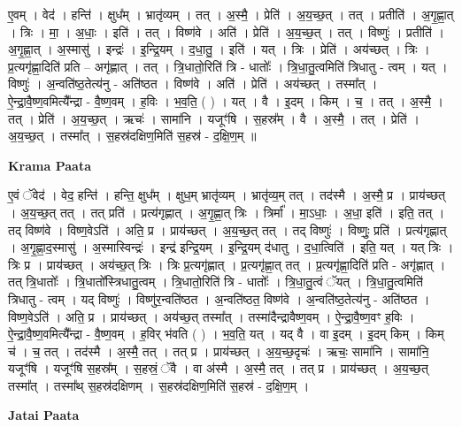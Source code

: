 \documentclass[17pt]{extarticle}
\begin{document}
ए॒वम् । वेद॑ । हन्ति॑ । क्षुध᳚म् । भ्रातृ॑व्यम् । तत् । अ॒स्मै॒ । प्रेति॑ । अ॒य॒च्छ॒त् । तत् । प्रतीति॑ । अ॒गृ॒ह्णा॒त् । त्रिः । मा॒ । अ॒धाः॒ । इति॑ । तत् । विष्ण॑वे । अति॑ । प्रेति॑ । अ॒य॒च्छ॒त् । तत् । विष्णुः॑ । प्रतीति॑ । अ॒गृ॒ह्णा॒त् । अ॒स्मासु॑ । इन्द्रः॑ । इ॒न्द्रि॒यम् । द॒धा॒तु॒ । इति॑ । यत् । त्रिः । प्रेति॑ । अय॑च्छत् । त्रिः । प्र॒त्यगृ॑ह्णा॒दिति॑ प्रति – अगृ॑ह्णात् । तत् । त्रि॒धातो॒रिति॑ त्रि - धातोः᳚ । त्रि॒धा॒तु॒त्वमिति॑ त्रिधातु - त्वम् । यत् । विष्णुः॑ । अ॒न्वति॑ष्ठ॒तेत्य॑नु - अति॑ष्ठत । विष्ण॑वे । अति॑ । प्रेति॑ । अय॑च्छत् । तस्मा᳚त् । ऐ॒न्द्रा॒वै॒ष्ण॒वमित्यै᳚न्द्रा - वै॒ष्ण॒वम् । ह॒विः । भ॒व॒ति॒ ( ) । यत् । वै । इ॒दम् । किम् । च॒ । तत् । अ॒स्मै॒ । तत् । प्रेति॑ । अ॒य॒च्छ॒त् । ऋचः॑ । सामा॑नि । यजूꣳ॑षि । स॒हस्र᳚म् । वै । अ॒स्मै॒ । तत् । प्रेति॑ । अ॒य॒च्छ॒त् । तस्मा᳚त् । स॒हस्र॑दक्षिण॒मिति॑ स॒हस्र॑ - द॒क्षि॒ण॒म् ॥  \newline


\textbf{Krama Paata} \newline

ए॒वं ॅवेद॑ । वेद॒ हन्ति॑ । हन्ति॒ क्षुध᳚म् । क्षुध॒म् भ्रातृ॑व्यम् । भ्रातृ॑व्य॒म् तत् । तद॑स्मै । अ॒स्मै॒ प्र । प्राय॑च्छत् । अ॒य॒च्छ॒त् तत् । तत् प्रति॑ । प्रत्य॑गृह्णात् । अ॒गृ॒ह्णा॒त् त्रिः । त्रिर्मा᳚ । मा॒ऽधाः॒ । अ॒धा॒ इति॑ । इति॒ तत् । तद् विष्ण॑वे । विष्ण॒वेऽति॑ । अति॒ प्र । प्राय॑च्छत् । अ॒य॒च्छ॒त् तत् । तद् विष्णुः॑ । विष्णुः॒ प्रति॑ । प्रत्य॑गृह्णात् । अ॒गृ॒ह्णा॒द॒स्मासु॑ । अ॒स्मास्विन्द्रः॑ । इन्द्र॑ इन्द्रि॒यम् । इ॒न्द्रि॒यम् द॑धातु । द॒धा॒त्विति॑ । इति॒ यत् । यत् त्रिः । त्रिः प्र । प्राय॑च्छत् । अय॑च्छ॒त् त्रिः । त्रिः प्र॒त्यगृ॑ह्णात् । प्र॒त्यगृ॑ह्णा॒त् तत् । प्र॒त्यगृ॑ह्णा॒दिति॑ प्रति - अगृ॑ह्णात् । तत् त्रि॒धातोः᳚ । त्रि॒धातो᳚स्त्रिधातु॒त्वम् । त्रि॒धातो॒रिति॑ त्रि - धातोः᳚ । त्रि॒धा॒तु॒त्वं ॅयत् । त्रि॒धा॒तु॒त्वमिति॑ त्रिधातु - त्वम् । यद् विष्णुः॑ । विष्णु॑र॒न्वति॑ष्ठत । अ॒न्वति॑ष्ठत॒ विष्ण॑वे । अ॒न्वति॑ष्ठ॒तेत्य॑नु - अति॑ष्ठत । विष्ण॒वेऽति॑ । अति॒ प्र । प्राय॑च्छत् । अय॑च्छ॒त् तस्मा᳚त् । तस्मा॑दैन्द्रावैष्ण॒वम् । ऐ॒न्द्रा॒वै॒ष्ण॒वꣳ ह॒विः । ऐ॒न्द्रा॒वै॒ष्ण॒वमित्यै᳚न्द्रा - वै॒ष्ण॒वम् । ह॒विर् भ॑वति ( ) । भ॒व॒ति॒ यत् । यद् वै । वा इ॒दम् । इ॒दम् किम् । किम् च॑ । च॒ तत् । तद॑स्मै । अ॒स्मै॒ तत् । तत् प्र । प्राय॑च्छत् । अ॒य॒च्छ॒दृचः॑ । ऋचः॒ सामा॑नि । सामा॑नि॒ यजूꣳ॑षि । यजूꣳ॑षि स॒हस्र᳚म् । स॒हस्रं॒ ॅवै । वा अ॑स्मै । अ॒स्मै॒ तत् । तत् प्र । प्राय॑च्छत् । अ॒य॒च्छ॒त् तस्मा᳚त् । तस्मा᳚थ् स॒हस्र॑दक्षिणम् । स॒हस्र॑दक्षिण॒मिति॑ स॒हस्र॑ - द॒क्षि॒ण॒म् । \newline

\textbf{Jatai Paata} \newline
\end{document}
